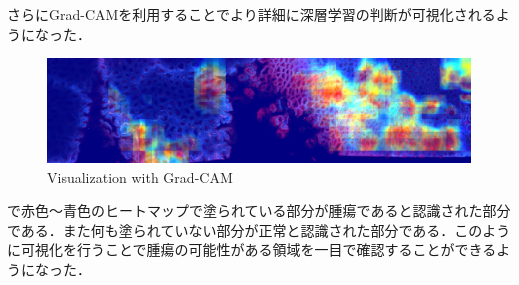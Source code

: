 さらにGrad-CAMを利用することでより詳細に深層学習の判断が可視化されるようになった．
\begin{figure}
	\centering
	\includegraphics[width=0.7\linewidth]{fig/chapter4/large-grad-cam-step100-rm-black}
	\caption{Visualization with Grad-CAM}
	\label{fig:large-grad}
\end{figure}

で赤色〜青色のヒートマップで塗られている部分が腫瘍であると認識された部分である．また何も塗られていない部分が正常と認識された部分である．このように可視化を行うことで腫瘍の可能性がある領域を一目で確認することができるようになった．